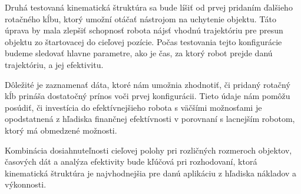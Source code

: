 Druhá testovaná kinematická štruktúra sa bude líšiť od prvej pridaním ďalšieho rotačného kĺbu, ktorý umožní otáčať nástrojom na uchytenie objektu. Táto úprava by mala zlepšiť schopnosť robota nájsť vhodnú trajektóriu pre presun objektu zo štartovacej do cieľovej pozície. Počas testovania tejto konfigurácie budeme sledovať hlavne parametre, ako je čas, za ktorý robot prejde danú trajektóriu, a jej efektivitu.

Dôležité je zaznamenať dáta, ktoré nám umožnia zhodnotiť, či pridaný rotačný kĺb prináša dostatočný prínos voči prvej konfigurácii. Tieto údaje nám pomôžu posúdiť, či investícia do efektívnejšieho robota s väčšími možnosťami je opodstatnená z hľadiska finančnej efektívnosti v porovnaní s lacnejším robotom, ktorý má obmedzené možnosti.

Kombinácia dosiahnuteľnosti cieľovej polohy pri rozličných rozmeroch objektov,  časových dát a analýza efektivity bude kľúčová pri rozhodovaní, ktorá kinematická štruktúra je najvhodnejšia pre danú aplikáciu z hľadiska nákladov a výkonnosti. 



